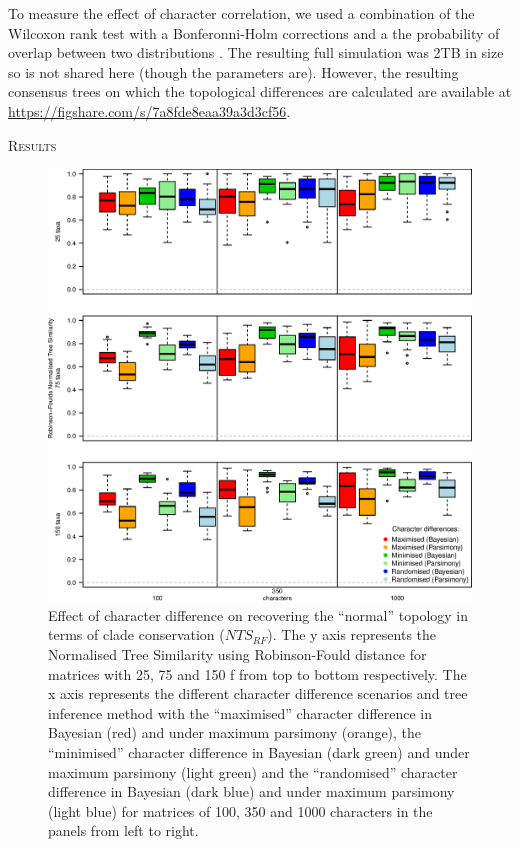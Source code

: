 \documentclass[12pt,letterpaper]{article}
\renewcommand{\section}[1]{%
\bigskip
\begin{center}
\begin{Large}
\normalfont\scshape #1
\medskip
\end{Large}
\end{center}}
\begin{document}
To measure the effect of character correlation, we used a combination of the Wilcoxon rank test with a Bonferonni-Holm corrections \citep{holm1979simple} and a the probability of overlap between two distributions \citep[the Bhattacharyya Coefficient: $BC$;][]{Bhattacharyya}.
The resulting full simulation was 2TB in size so is not shared here (though the parameters are).
However, the resulting consensus trees on which the topological differences are calculated are available at \url{https://figshare.com/s/7a8fde8eaa39a3d3cf56}.

\section{Results}

\begin{figure}[!htbp]
\centering
   \includegraphics[width=1\textwidth]{RF_results_best.eps}
\caption{\small{Effect of character difference on recovering the ``normal'' topology in terms of clade conservation ($NTS_{RF}$). The y axis represents the Normalised Tree Similarity using Robinson-Fould distance for matrices with 25, 75 and 150 f from top to bottom respectively. The x axis represents the different character difference scenarios and tree inference method with the ``maximised'' character difference in Bayesian (red) and under maximum parsimony (orange), the ``minimised'' character difference in Bayesian (dark green) and under maximum parsimony (light green) and the ``randomised'' character difference in Bayesian (dark blue) and under maximum parsimony (light blue) for matrices of 100, 350 and 1000 characters in the panels from left to right.}}
\label{Fig:RF_results_best}
\end{figure}
\end{document}
